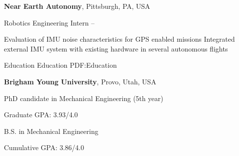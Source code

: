 \documentclass[letterpaper,MMMyyyy,nonstopmode]{simpleresumecv}
\begin{document}
\begin{Body}
\Gap
\Entry
\textbf{Near Earth Autonomy},
Pittsburgh, PA, USA

\Gap
\BulletItem
Robotics Engineering Intern
\hfill
{} --
\begin{Detail}
\SubBulletItem
Evaluation of IMU noise characteristics for GPS enabled missions
\SubBulletItem
Integrated external IMU system with existing hardware in several autonomous flights
\end{Detail}





\Section
{Education}
{Education}
{PDF:Education}

\Entry
{\textbf{Brigham Young University}},
Provo, Utah, USA

\Gap
\BulletItem
PhD candidate in Mechanical Engineering (5th year)
\hfill
\begin{Detail}
\SubBulletItem
Graduate GPA: 3.93/4.0
\end{Detail}

\BulletItem
B.S. in Mechanical Engineering
\hfill
\begin{Detail}
\SubBulletItem
Cumulative GPA: 3.86/4.0
\end{Detail}


\end{Body}
\end{document}
